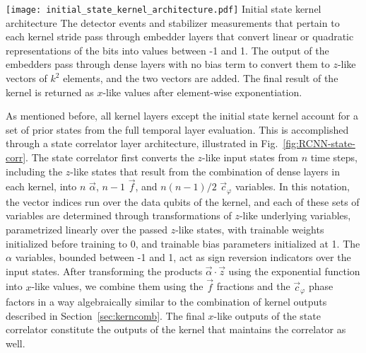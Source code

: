 \begin{figure*}[htb]
\centering
\texttt{[image: initial\_state\_kernel\_architecture.pdf]}
\ccaption
{Initial state kernel architecture}
{
The detector events and stabilizer measurements that pertain to each kernel stride pass through embedder layers that convert linear or quadratic representations of the bits into values between -1 and 1.
The output of the embedders pass through dense layers with no bias term to convert them to $z$-like vectors of $k^2$ elements, and the two vectors are added. The final result of the kernel is returned as $x$-like values after element-wise exponentiation.
}
\label{fig:RCNN-init-arch}
\end{figure*}

As mentioned before, all kernel layers except the initial state kernel account for a set of prior states from the full temporal layer evaluation. This is accomplished through a state correlator layer architecture, illustrated in Fig.~\ref{fig:RCNN-state-corr}. The state correlator first converts the $z$-like input states from $n$ time steps, including the $z$-like states that result from the combination of dense layers in each kernel, into $n$ $\vec{\alpha}$, $n-1$ $\vec{f}$, and $n(n-1)/2$ $\vec{c}_\varphi$ variables. In this notation, the vector indices run over the data qubits of the kernel, and each of these sets of variables are determined through transformations of $z$-like underlying variables, parametrized linearly over the passed $z$-like states, with trainable weights initialized before training to 0, and trainable bias parameters initialized at 1. The $\alpha$ variables, bounded between -1 and 1, act as sign reversion indicators over the input states. After transforming the products $\vec{\alpha} \cdot \vec{z}$ using the exponential function into $x$-like values, we combine them using the $\vec{f}$ fractions and the $\vec{c}_\varphi$ phase factors in a way algebraically similar to the combination of kernel outputs described in Section~\ref{sec:kerncomb}. The final $x$-like outputs of the state correlator constitute the outputs of the kernel that maintains the correlator as well.


